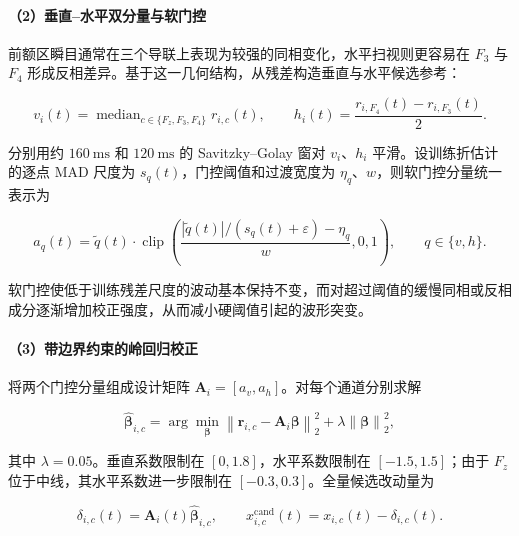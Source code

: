 \documentclass[a4paper]{ctexart}
\numberwithin{figure}{section}       %
\begin{document}
\paragraph{（2）垂直--水平双分量与软门控}

前额区瞬目通常在三个导联上表现为较强的同相变化，水平扫视则更容易在 $F_3$ 与 $F_4$ 形成反相差异。基于这一几何结构，从残差构造垂直与水平候选参考：

\begin{equation}
    v_i(t)=\mathop{\mathrm{median}}_{c\in\{F_z,F_3,F_4\}}r_{i,c}(t),
    \qquad
    h_i(t)=\frac{r_{i,F_4}(t)-r_{i,F_3}(t)}{2}.
    \label{eq:q1_components}
\end{equation}

分别用约 $160~\mathrm{ms}$ 和 $120~\mathrm{ms}$ 的 Savitzky--Golay 窗对 $v_i$、$h_i$ 平滑。设训练折估计的逐点 MAD 尺度为 $s_q(t)$，门控阈值和过渡宽度为 $\eta_q$、$w$，则软门控分量统一表示为

\begin{equation}
    a_q(t)=\tilde q(t)\cdot
    \operatorname{clip}\!\left(
    \frac{|\tilde q(t)|/(s_q(t)+\varepsilon)-\eta_q}{w},0,1
    \right),
    \qquad q\in\{v,h\}.
    \label{eq:q1_gate}
\end{equation}

软门控使低于训练残差尺度的波动基本保持不变，而对超过阈值的缓慢同相或反相成分逐渐增加校正强度，从而减小硬阈值引起的波形突变。

\paragraph{（3）带边界约束的岭回归校正}

将两个门控分量组成设计矩阵 $\mathbf A_i=[a_v,a_h]$。对每个通道分别求解

\begin{equation}
    \hat{\boldsymbol\beta}_{i,c}=
    \arg\min_{\boldsymbol\beta}
    \left\|\mathbf r_{i,c}-\mathbf A_i\boldsymbol\beta\right\|_2^2
    +\lambda\left\|\boldsymbol\beta\right\|_2^2,
    \label{eq:q1_ridge}
\end{equation}

其中 $\lambda=0.05$。垂直系数限制在 $[0,1.8]$，水平系数限制在 $[-1.5,1.5]$；由于 $F_z$ 位于中线，其水平系数进一步限制在 $[-0.3,0.3]$。全量候选改动量为

\begin{equation}
    \delta_{i,c}(t)=\mathbf A_i(t)\hat{\boldsymbol\beta}_{i,c},
    \qquad x^{\mathrm{cand}}_{i,c}(t)=x_{i,c}(t)-\delta_{i,c}(t).
    \label{eq:q1_candidate}
\end{equation}
\end{document}

